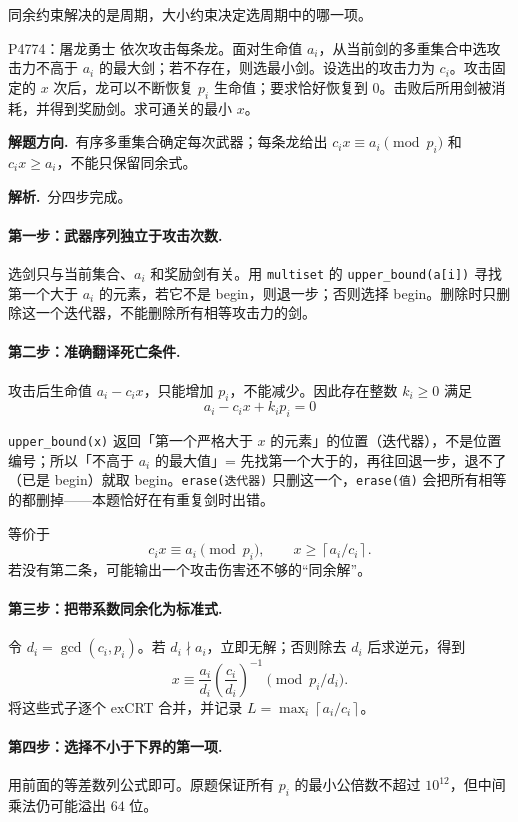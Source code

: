 \documentclass[UTF8,a4paper,11pt,twoside,openright,fontset=fandol]{ctexbook}
\theoremstyle{definition}
\newcommand{\ceil}[1]{\left\lceil #1\right\rceil}
\newcommand{\sol}{\par\noindent\textbf{解析.}\ }
\newcommand{\hint}{\par\noindent\textbf{解题方向.}\ }
\begin{document}
同余约束解决的是周期，大小约束决定选周期中的哪一项。


\begin{problem}{P4774：屠龙勇士}
依次攻击每条龙。面对生命值 $a_i$，从当前剑的多重集合中选攻击力不高于 $a_i$ 的最大剑；若不存在，则选最小剑。设选出的攻击力为 $c_i$。攻击固定的 $x$ 次后，龙可以不断恢复 $p_i$ 生命值；要求恰好恢复到 $0$。击败后所用剑被消耗，并得到奖励剑。求可通关的最小 $x$。
\end{problem}
\hint 有序多重集合确定每次武器；每条龙给出 $c_ix\equiv a_i\pmod{p_i}$ 和 $c_ix\ge a_i$，不能只保留同余式。

\sol 分四步完成。
\paragraph{第一步：武器序列独立于攻击次数.}
选剑只与当前集合、$a_i$ 和奖励剑有关。用 \texttt{multiset} 的 \texttt{upper\_bound(a[i])} 寻找第一个大于 $a_i$ 的元素，若它不是 begin，则退一步；否则选择 begin。删除时只删除这一个迭代器，不能删除所有相等攻击力的剑。

\paragraph{第二步：准确翻译死亡条件.}
攻击后生命值 $a_i-c_ix$，只能增加 $p_i$，不能减少。因此存在整数 $k_i\ge0$ 满足
\[
 a_i-c_ix+k_ip_i=0
\]

\begin{tip}[两个容器术语]
\texttt{upper\_bound(x)} 返回「第一个严格大于 $x$ 的元素」的位置（迭代器），不是位置编号；所以「不高于 $a_i$ 的最大值」= 先找第一个大于的，再往回退一步，退不了（已是 begin）就取 begin。\texttt{erase(迭代器)} 只删这一个，\texttt{erase(值)} 会把所有相等的都删掉——本题恰好在有重复剑时出错。
\end{tip}

等价于
\[
 c_ix\equiv a_i\pmod{p_i},\qquad x\ge\ceil{a_i/c_i}.
\]
若没有第二条，可能输出一个攻击伤害还不够的“同余解”。

\paragraph{第三步：把带系数同余化为标准式.}
令 $d_i=\gcd(c_i,p_i)$。若 $d_i\nmid a_i$，立即无解；否则除去 $d_i$ 后求逆元，得到
\[
 x\equiv \frac{a_i}{d_i}\left(\frac{c_i}{d_i}\right)^{-1}
 \pmod{p_i/d_i}.
\]
将这些式子逐个 exCRT 合并，并记录 $L=\max_i\ceil{a_i/c_i}$。
\paragraph{第四步：选择不小于下界的第一项.}
用前面的等差数列公式即可。原题保证所有 $p_i$ 的最小公倍数不超过 $10^{12}$，但中间乘法仍可能溢出 $64$ 位。
\end{document}

